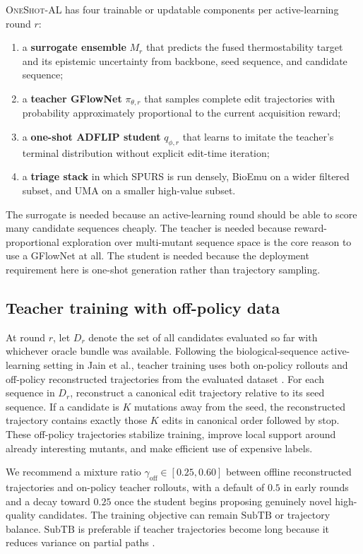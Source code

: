 \documentclass[11pt]{article}
\newcommand{\SubTB}{\ensuremath{\mathrm{SubTB}}}
\newcommand{\methodIII}{\textsc{OneShot-AL}}
\begin{document}
\methodIII{} has four trainable or updatable components per active-learning round $r$:
\begin{enumerate}[leftmargin=1.5em]
    \item a \textbf{surrogate ensemble} $M_r$ that predicts the fused thermostability target and its epistemic uncertainty from backbone, seed sequence, and candidate sequence;
    \item a \textbf{teacher GFlowNet} $\pi_{\theta,r}$ that samples complete edit trajectories with probability approximately proportional to the current acquisition reward;
    \item a \textbf{one-shot ADFLIP student} $q_{\phi,r}$ that learns to imitate the teacher's terminal distribution without explicit edit-time iteration;
    \item a \textbf{triage stack} in which SPURS is run densely, BioEmu on a wider filtered subset, and UMA on a smaller high-value subset.
\end{enumerate}
The surrogate is needed because an active-learning round should be able to score many candidate sequences cheaply. The teacher is needed because reward-proportional exploration over multi-mutant sequence space is the core reason to use a GFlowNet at all. The student is needed because the deployment requirement here is one-shot generation rather than trajectory sampling.

\subsection{Teacher training with off-policy data}

At round $r$, let $D_r$ denote the set of all candidates evaluated so far with whichever oracle bundle was available. Following the biological-sequence active-learning setting in Jain et al., teacher training uses both on-policy rollouts and off-policy reconstructed trajectories from the evaluated dataset \citep{jain2022bioseqgfn}. For each sequence in $D_r$, reconstruct a canonical edit trajectory relative to its seed sequence. If a candidate is $K$ mutations away from the seed, the reconstructed trajectory contains exactly those $K$ edits in canonical order followed by stop. These off-policy trajectories stabilize training, improve local support around already interesting mutants, and make efficient use of expensive labels.

We recommend a mixture ratio $\gamma_{\mathrm{off}}\in[0.25,0.60]$ between offline reconstructed trajectories and on-policy teacher rollouts, with a default of $0.5$ in early rounds and a decay toward $0.25$ once the student begins proposing genuinely novel high-quality candidates. The training objective can remain \SubTB{} or trajectory balance. \SubTB{} is preferable if teacher trajectories become long because it reduces variance on partial paths \citep{madan2023subtb}.
\end{document}

